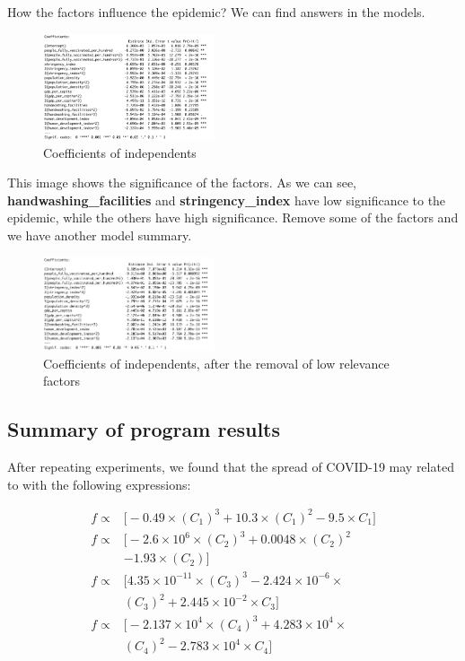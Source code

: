 \documentclass{article}
\begin{document}
\begin{multicols}{2}
How the factors influence the epidemic? We can find answers in the models.

\begin{figure}[H]
    \centering
    \includegraphics[width=0.45\textwidth]{rawresult.png}
    \caption{Coefficients of independents}
\end{figure}

This image shows the significance of the factors. As we can see, \textbf{handwashing\_facilities} and \textbf{stringency\_index} have low significance to the epidemic, while the others have high significance. Remove some of the factors and we have another model summary.

\begin{figure}[H]
    \centering
    \includegraphics[width=0.45\textwidth]{improvedresult.png}
    \caption{Coefficients of independents, after the removal of low relevance factors}
\end{figure}

\subsection{Summary of program results}
After repeating experiments, we found that the spread of COVID-19 may related to with the following expressions:

\begin{align*}
    f \propto& \Big [-0.49 \times \left(C_1\right)^3 + 10.3 \times \left(C_1\right)^2 - 9.5 \times C_1\Big ] \\
    f \propto& \Big [-2.6 \times 10^6 \times \left(C_2\right)^3 + 0.0048\times \left(C_2\right)^2 \\&- 1.93 \times \left(C_2\right) \Big ] \\
    f \propto& \Big [4.35\times 10^{-11} \times \left(C_3\right)^3 - 2.424 \times 10^{-6} \times \\&\left(C_3\right)^2 + 2.445 \times 10^{-2} \times C_3 \Big ]\\
    f \propto& \Big [-2.137\times 10^{4} \times \left(C_4\right)^3 + 4.283 \times 10^{4} \times \\&\left(C_4\right)^2 - 2.783 \times 10^{4} \times C_4 \Big ]\\
\end{align*}


\end{multicols}
\end{document}
